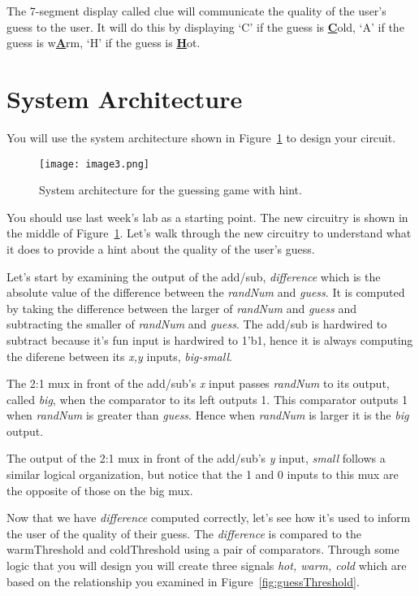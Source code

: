 The 7-segment display called clue will communicate the quality of the
user's guess to the user. It will do this by displaying `C' if the guess
is \textbf{\uline{C}}old, `A' if the guess is w\textbf{\uline{A}}rm, `H'
if the guess is \textbf{\uline{H}}ot.

\section{System Architecture}
You will use the system
architecture shown in Figure~\ref{fig:guessWithHintSystemArch} to
design your circuit.

\begin{figure}[ht]
    \texttt{[image:  image3.png]}
    \caption{System architecture for the guessing game with hint. }
    \label{fig:guessWithHintSystemArch}
\end{figure}

You should use last week's lab as a starting point. The new circuitry is shown in the middle of
Figure~\ref{fig:guessWithHintSystemArch}.  Let's walk through the new circuitry
to understand what it does to provide a hint about the quality of the user's guess.

Let's start by examining the output of the add/sub, \emph{difference} which is the absolute
value of the difference between the \emph{randNum} and \emph{guess}.  It is computed
by taking the difference between the larger of \emph{randNum} and \emph{guess} and
subtracting the smaller of \emph{randNum} and \emph{guess}.  The add/sub is hardwired
to subtract because it's fun input is hardwired to 1'b1, hence it is always computing the
diferene between its \emph{x,y} inputs, \emph{big-small}.

The 2:1 mux in front of the add/sub's \emph{x} input passes \emph{randNum} to its
output, called \emph{big}, when the comparator to its left outputs 1.  This comparator
outputs 1 when \emph{randNum} is greater than \emph{guess}.  Hence when \emph{randNum}
is larger it is the \emph{big} output.

The output of the 2:1 mux in front of the add/sub's \emph{y} input, \emph{small} follows
a similar logical organization, but notice that the 1 and 0 inputs to this mux are the
opposite of those on the big mux.

Now that we have \emph{difference} computed correctly, let's see how it's used
to inform the user of the quality of their guess. The
\emph{difference} is compared to the warmThreshold and coldThreshold
using a pair of comparators. Through some logic that you will design you
will create three signals \emph{hot, warm, cold} which are based on the
relationship you examined in Figure~\ref{fig:guessThreshold}.

